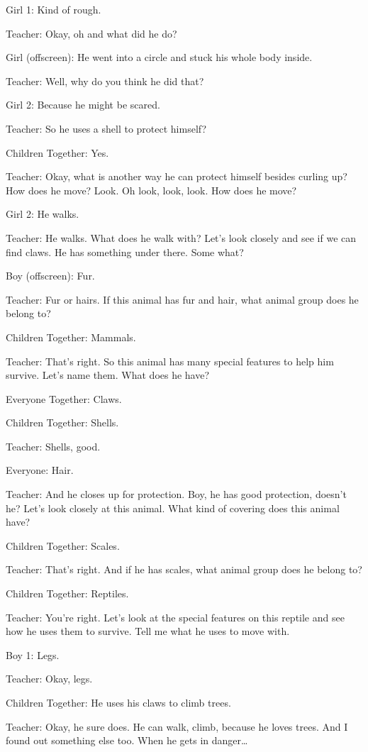 Girl 1: Kind of rough.

Teacher: Okay, oh and what did he do?

Girl (offscreen): He went into a circle and stuck his whole body inside.

Teacher: Well, why do you think he did that?

Girl 2: Because he might be scared.

Teacher: So he uses a shell to protect himself?

Children Together: Yes.

Teacher: Okay, what is another way he can protect himself besides curling up? How does he move? Look. Oh look, look, look. How does he move?

Girl 2: He walks.

Teacher: He walks. What does he walk with? Let's look closely and see if we can find claws. He has something under there. Some what?

Boy (offscreen): Fur.

Teacher: Fur or hairs. If this animal has fur and hair, what animal group does he belong to?

Children Together: Mammals.

Teacher: That's right. So this animal has many special features to help him survive. Let's name them. What does he have?

Everyone Together: Claws.

Children Together: Shells.

Teacher: Shells, good.

Everyone: Hair.

Teacher: And he closes up for protection. Boy, he has good protection, doesn't he? Let's look closely at this animal. What kind of covering does this animal have?

Children Together: Scales.

Teacher: That's right. And if he has scales, what animal group does he belong to?

Children Together: Reptiles.

Teacher: You're right. Let's look at the special features on this reptile and see how he uses them to survive. Tell me what he uses to move with.

Boy 1: Legs.

Teacher: Okay, legs.

Children Together: He uses his claws to climb trees.

Teacher: Okay, he sure does. He can walk, climb, because he loves trees. And I found out something else too. When he gets in danger\dots

